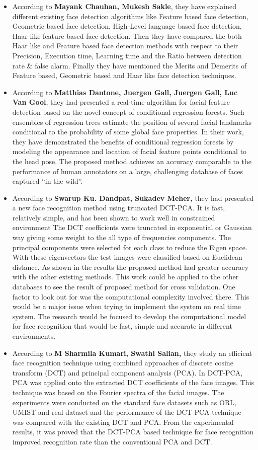 \begin{itemize}
\item According to \textbf{Mayank Chauhan, Mukesh Sakle}, they have explained different existing face detection algorithms like Feature based face detection, Geometric based face detection, High-Level language based face detection, Haar like feature based face detection. Then they have compared the both Haar like and Feature based face detection methods with respect to their Precision, Execution time, Learning time and the Ratio between detection rate \& false alarm. Finally they have mentioned the Merits and Demerits of Feature based, Geometric based and Haar like face detection techniques.
\item According to \textbf{Matthias Dantone, Juergen Gall, Juergen Gall, Luc Van Gool}, they had presented a real-time algorithm for facial feature detection based on the novel concept of conditional regression forests. Such ensembles of regression trees estimate the position of several facial landmarks conditional to the probability of some global face properties. In their work, they have demonstrated the benefits of conditional regression forests by modeling the appearance and location of facial feature points conditional to the head pose. The proposed method achieves an accuracy comparable to the performance of human annotators on a large, challenging database of faces captured “in the wild”.
\item According to \textbf{Swarup Ku. Dandpat, Sukadev Meher,} they had presented a new face recognition method using truncated DCT-PCA. It is fast, relatively simple, and has been shown to work well in constrained environment The DCT coefficients were truncated in exponential or Gaussian way giving some weight to the all type of frequencies components. The principal components were selected for each class to reduce the Eigen space. With these eigenvectors the test images were classified based on Euclidean distance. As shown in the results the proposed method had greater accuracy with the other existing methods. This work could be applied to the other databases to see the result of proposed method for cross validation. One factor to look out for was the computational complexity involved there. This would be a major issue when trying to implement the system on real time system. The research would be focused to develop the computational model for face recognition that would be fast, simple and accurate in different environments.
	
\item According to \textbf{M Sharmila Kumari, Swathi Salian,} they study an efficient face recognition technique using combined approaches of discrete cosine transform (DCT) and principal component analysis (PCA). In DCT-PCA, PCA was applied onto the extracted DCT coefficients of the face images. This technique was based on the Fourier spectra of the facial images. The experiments were conducted on the standard face datasets such as ORL, UMIST and real dataset and the performance of the DCT-PCA technique was compared with the existing DCT and PCA. From the experimental results, it was proved that the DCT-PCA based technique for face recognition improved recognition rate than the conventional PCA and DCT.
	

\end{itemize}
